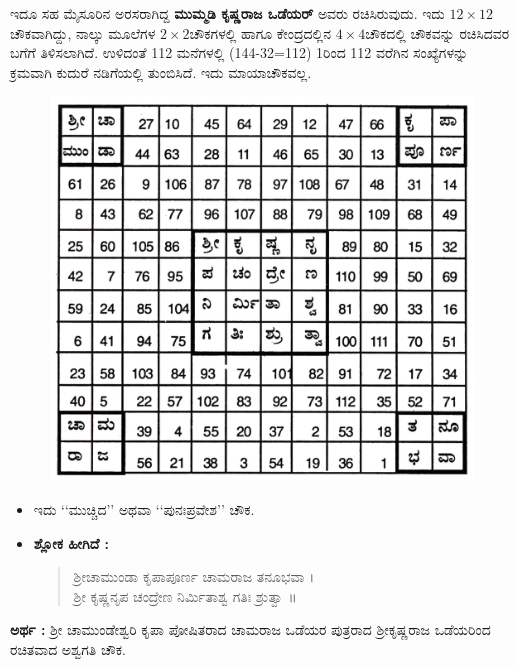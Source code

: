 ಇದೂ ಸಹ ಮೈಸೂರಿನ ಅರಸರಾಗಿದ್ದ \textbf{ಮುಮ್ಮಡಿ ಕೃಷ್ಣರಾಜ ಒಡೆಯರ್} ಅವರು ರಚಿಸಿ\-ರುವುದು. ಇದು $12 \times 12$ಚೌಕವಾಗಿದ್ದು, ನಾಲ್ಕು ಮೂಲೆಗಳ $2 \times 2$ಚೌಕಗಳಲ್ಲಿ ಹಾಗೂ ಕೇಂದ್ರದಲ್ಲಿನ $4 \times 4$ಚೌಕದಲ್ಲಿ ಚೌಕವನ್ನು ರಚಿಸಿದವರ ಬಗೆಗೆ ತಿಳಿಸಲಾಗಿದೆ. ಉಳಿದಂತೆ 112 ಮನೆಗಳಲ್ಲಿ (144-32=112) 1ರಿಂದ 112 ವರೆಗಿನ ಸಂಖ್ಯೆಗಳನ್ನು ಕ್ರಮವಾಗಿ ಕುದುರೆ ನಡಿಗೆಯಲ್ಲಿ ತುಂಬಿಸಿದೆ. ಇದು ಮಾಯಾಚೌಕವಲ್ಲ.
\begin{figure}[H]
\includegraphics{src/figures/chap6/fig6-11.jpg}
\end{figure}

\begin{itemize}
	\item ಇದು ‘‘ಮುಚ್ಚಿದ’’ ಅಥವಾ ‘‘ಪುನಃಪ್ರವೇಶ’’ ಚೌಕ.
	\item \textbf{ಶ್ಲೋಕ ಹೀಗಿದೆ :}
	\begin{quote}
	ಶ್ರೀಚಾಮುಂಡಾ ಕೃಪಾಪೂರ್ಣ ಚಾಮರಾಜ ತನೂಭವಾ ।\\
	ಶ್ರೀ ಕೃಷ್ಣನೃಪ ಚಂದ್ರೇಣ ನಿರ್ಮಿತಾಶ್ವ ಗತಿಃ ಶ್ರುತ್ವಾ ॥
	\end{quote}
\end{itemize}

\textbf{ಅರ್ಥ :} ಶ್ರೀ ಚಾಮುಂಡೇಶ್ವರಿ ಕೃಪಾ ಪೋಷಿತರಾದ ಚಾಮರಾಜ ಒಡೆಯರ ಪುತ್ರರಾದ ಶ್ರೀಕೃಷ್ಣರಾಜ ಒಡೆಯರಿಂದ ರಚಿತವಾದ ಅಶ್ವಗತಿ ಚೌಕ.

